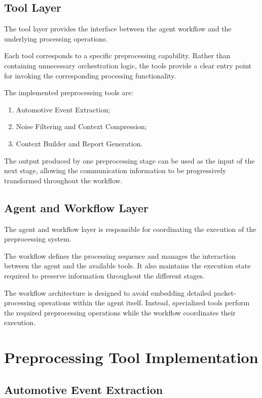 \subsection{Tool Layer}

The tool layer provides the interface between the agent workflow and the underlying processing operations.

Each tool corresponds to a specific preprocessing capability. Rather than containing unnecessary orchestration logic, the tools provide a clear entry point for invoking the corresponding processing functionality.

The implemented preprocessing tools are:

\begin{enumerate}
    \item Automotive Event Extraction;
    \item Noise Filtering and Context Compression;
    \item Context Builder and Report Generation.
\end{enumerate}

The output produced by one preprocessing stage can be used as the input of the next stage, allowing the communication information to be progressively transformed throughout the workflow.

\subsection{Agent and Workflow Layer}

The agent and workflow layer is responsible for coordinating the execution of the preprocessing system.

The workflow defines the processing sequence and manages the interaction between the agent and the available tools. It also maintains the execution state required to preserve information throughout the different stages.

The workflow architecture is designed to avoid embedding detailed packet-processing operations within the agent itself. Instead, specialized tools perform the required preprocessing operations while the workflow coordinates their execution.

\section{Preprocessing Tool Implementation}

\subsection{Automotive Event Extraction}

